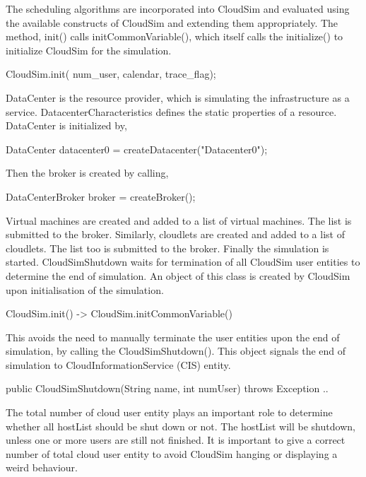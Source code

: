 \documentclass[times, 10pt,twocolumn]{article}
\begin{document}
The scheduling algorithms are incorporated into CloudSim and evaluated using the available constructs of CloudSim and extending them appropriately. The method, init() calls initCommonVariable(), which itself calls the initialize() to initialize CloudSim for the simulation.
\begin{verbatimtab}
CloudSim.init(
    num_user, calendar, trace_flag);
\end{verbatimtab}
DataCenter is the resource provider, which is simulating the infrastructure as a service. DatacenterCharacteristics defines the static properties of a resource. DataCenter is initialized by,
\begin{verbatimtab}
DataCenter datacenter0 = 
    createDatacenter("Datacenter0");
\end{verbatimtab}
Then the broker is created by calling,
\begin{verbatimtab}
DataCenterBroker broker = createBroker();
\end{verbatimtab}
Virtual machines are created and added to a list of virtual machines. The list is submitted to the broker. Similarly, cloudlets are created and added to a list of cloudlets. The list too is submitted to the broker. Finally the simulation is started. CloudSimShutdown waits for termination of all CloudSim user entities to determine the end of simulation. An object of this class is created by CloudSim upon initialisation of the simulation.
\begin{verbatimtab}
CloudSim.init() -> 
    CloudSim.initCommonVariable()
\end{verbatimtab}
This avoids the need to manually terminate the user entities upon the end of simulation, by calling the CloudSimShutdown(). This object signals the end of simulation to CloudInformationService (CIS) entity.
\begin{verbatimtab}
public CloudSimShutdown(String name,
    int numUser) throws Exception { .. }
\end{verbatimtab}
The total number of cloud user entity plays an important role to determine whether all hostList should be shut down or not. The hostList will be shutdown, unless one or more users are still not finished. It is important to give a correct number of total cloud user entity to avoid CloudSim hanging or displaying a weird behaviour. 
\end{document}
